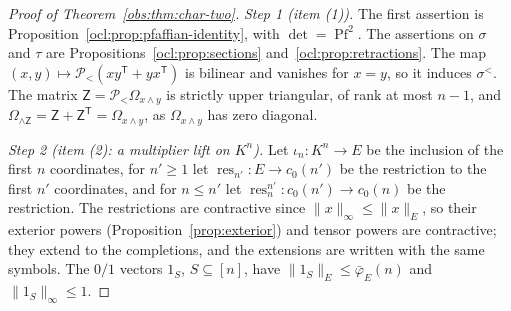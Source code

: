 \documentclass[11pt]{amsart}
\theoremstyle{definition}
\theoremstyle{remark}
\numberwithin{equation}{section}
\newcommand{\norm}[1]{\lVert #1\rVert}
\theoremstyle{plain}
\theoremstyle{definition}
\theoremstyle{plain}
\newcommand{\cP}{\mathcal P}
\begin{document}
\begin{proof}[Proof of Theorem~\ref{obs:thm:char-two}]
\emph{Step 1 (item (1)).} The first assertion is Proposition~\ref{ocl:prop:pfaffian-identity}, with $\det=\operatorname{Pf}^2$.
The assertions on $\sigma$ and $\tau$ are Propositions~\ref{ocl:prop:sections} and~\ref{ocl:prop:retractions}. The map $(x,y)\mapsto\cP_<(xy^{\mathsf T}+
yx^{\mathsf T})$ is bilinear and vanishes for $x=y$, so it induces $\sigma^<$. The matrix $\mathsf Z=\cP_<
\Omega_{x\wedge y}$ is strictly upper triangular, of rank at most $n-1$, and $\Omega_{\wedge\mathsf Z}=\mathsf Z+
\mathsf Z^{\mathsf T}=\Omega_{x\wedge y}$, as $\Omega_{x\wedge y}$ has zero diagonal.

\emph{Step 2 (item (2): a multiplier lift on $K^n$).} Let $\iota_n\colon K^n\to E$ be the inclusion of the first $n$
coordinates, for $n'\ge1$ let $\operatorname{res}_{n'}\colon E\to c_0(n')$ be the restriction to the first $n'$
coordinates, and for $n\le n'$ let $\operatorname{res}^{n'}_n\colon c_0(n')\to c_0(n)$ be the restriction. The
restrictions are contractive since $\norm x_\infty\le\norm x_E$, so their exterior powers (Proposition~\ref{prop:exterior})
and tensor powers are contractive; they extend to the completions, and the extensions are written with the same
symbols.
The $0/1$ vectors $1_S$, $S\subseteq[n]$, have $\norm{1_S}_E\le\bar\varphi_E(n)$ and $\norm{1_S}_\infty\le1$.


\end{proof}
\end{document}
